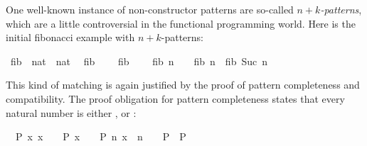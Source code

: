 \begin{isabellebody}
\begin{isamarkuptext}
  One well-known instance of non-constructor patterns are
  so-called \emph{$n+k$-patterns}, which are a little controversial in
  the functional programming world. Here is the initial fibonacci
  example with $n+k$-patterns:%
\end{isamarkuptext}%
\isamarkuptrue%
\isamarkupfalse%
\ fib{}\ {}{}\ {}nat\ {}\ nat{}\isanewline
{}\isanewline
\ \ {}fib{}\ {}\ {}\ {}{}\isanewline
{}\ {}fib{}\ {}\ {}\ {}{}\isanewline
{}\ {}fib{}\ {}n\ {}\ {}{}\ {}\ fib{}\ n\ {}\ fib{}\ {}Suc\ n{}{}%
\isadelimproof
%
\endisadelimproof
%
\isatagproof
%
\begin{isamarkuptxt}%
This kind of matching is again justified by the proof of pattern
  completeness and compatibility. 
  The proof obligation for pattern completeness states that every natural number is
  either ,  or :

  \begin{isabelle}%
\ {}{}\ {}P\ x{}\ {}x\ {}\ {}\ {}\ P{}\ x\ {}\ {}\ {}\ P{}\ {}n{}\ x\ {}\ n\ {}\ {}\ {}\ P{}\ {}\ P%
\end{isabelle}


\end{isamarkuptxt}
\end{isabellebody}

